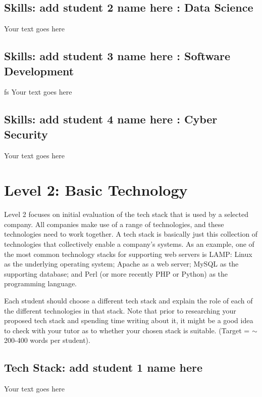 \documentclass[a4paper, 11pt]{report}
\begin{document}
\subsection{Skills: add student 2 name here : Data Science}

Your text goes here

\subsection{Skills: add student 3 name here : Software Development}
fs
Your text goes here

\subsection{Skills: add student 4 name here : Cyber Security}

Your text goes here



\newpage
\section{Level 2: Basic Technology}

Level 2 focuses on initial evaluation of the tech stack that is used by a selected company. All companies make use of a range of technologies, and these technologies need to work together. A tech stack is basically just this collection of technologies that collectively enable a company's systems. As an example, one of the most common technology stacks for supporting web servers is LAMP: Linux as the underlying operating system; Apache as a web server; MySQL as the supporting database; and Perl (or more recently PHP or Python) as the programming language.

Each student should choose a different tech stack and explain the role of each of the different technologies in that stack. Note that prior to researching your proposed tech stack and spending time writing about it, it might be a good idea to check with your tutor as to whether your chosen stack is suitable. (Target = $\sim$200-400 words per student).

\subsection{Tech Stack: add student 1 name here}

Your text goes here
\end{document}

